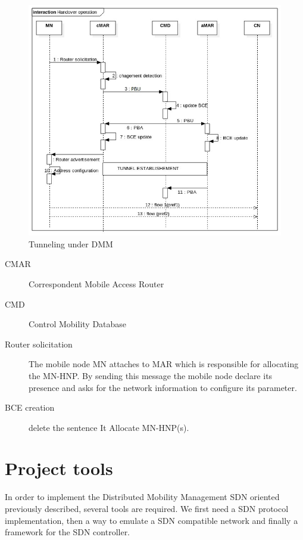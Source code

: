 \documentclass{article}
\begin{document}
\begin{figure}[h!]
  \centering
    \includegraphics[scale=0.5]{reportPictures/figure8.jpg}
  \caption{Tunneling under DMM}
\end{figure}

\begin{description}
\item[CMAR]Correspondent Mobile Access Router
\item[CMD]Control Mobility Database 
\item[Router solicitation] The mobile node MN attaches to MAR which is
  responsible for allocating the MN-HNP. By sending this message the
  mobile node declare its presence and asks for the network
  information to configure its parameter.

\item[BCE creation]delete the sentence It Allocate MN-HNP(s).     
\end{description}

\newpage

\part{Project tools}

In order to implement the Distributed Mobility Management SDN oriented
previously described, several tools are required. We first need a SDN
protocol implementation, then a way to emulate a SDN compatible
network and finally a framework for the SDN controller.
\end{document}
